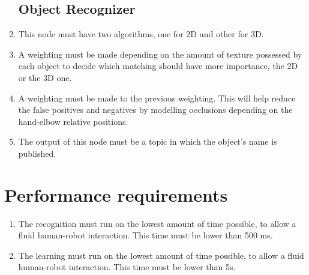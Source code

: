 \begin{enumerate}[label=\textbf{FR\threedigits*}, leftmargin=2cm]
\subsection{Object Recognizer}
	\item This node must have two algorithms, one for 2D and other for 3D. 
	\item A weighting must be made depending on the amount of texture possessed by each object to decide which matching should have more importance, the 2D or the 3D one. 
	\item A weighting must be made to the previous weighting. This will help reduce the false positives and negatives by modelling occlusions depending on the hand-elbow relative positions. 
	\item The output of this node must be a topic in which the object's name is published.
	






\end{enumerate}



\section{Performance requirements}

\begin{enumerate}[label=\textbf{PR\threedigits*}]
\item The recognition must run on the lowest amount of time possible, to allow a fluid human-robot interaction. This time must be lower than 500 ms. 
\item The learning must run on the lowest amount of time possible, to allow a fluid human-robot interaction. This time must be lower than 5s. 
\end{enumerate}



